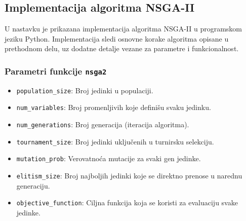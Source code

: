 \documentclass[12pt]{article}
\begin{document}
\subsection{Implementacija algoritma NSGA-II}
U nastavku je prikazana implementacija algoritma NSGA-II u programskom jeziku Python. Implementacija sledi osnovne korake algoritma opisane u prethodnom delu, uz dodatne detalje vezane za parametre i funkcionalnost. 

\subsubsection*{Parametri funkcije \texttt{nsga2}}
\begin{itemize}
    \item \texttt{population\_size}: Broj jedinki u populaciji.
    \item \texttt{num\_variables}: Broj promenljivih koje definišu svaku jedinku.
    \item \texttt{num\_generations}: Broj generacija (iteracija algoritma).
    \item \texttt{tournament\_size}: Broj jedinki uključenih u turnirsku selekciju.
    \item \texttt{mutation\_prob}: Verovatnoća mutacije za svaki gen jedinke.
    \item \texttt{elitism\_size}: Broj najboljih jedinki koje se direktno prenose u narednu generaciju.
    \item \texttt{objective\_function}: Ciljna funkcija koja se koristi za evaluaciju svake jedinke.
\end{itemize}
\end{document}
